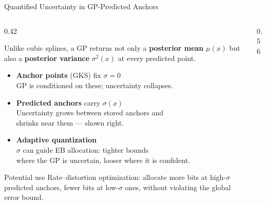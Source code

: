 \documentclass[aspectratio=169, 10pt]{beamer}
\begin{document}
\begin{frame}{Quantified Uncertainty in GP-Predicted Anchors}

\begin{columns}[T, totalwidth=\textwidth]
\begin{column}{0.42\textwidth}
  {\footnotesize
  Unlike cubic splines, a GP returns not only a \textbf{posterior mean}
  $\mu(x)$ but also a \textbf{posterior variance} $\sigma^2(x)$ at
  every predicted point.

  \medskip
  \begin{itemize}\setlength\itemsep{4pt}
    \item[\textcolor{camber}{\textbullet}]
      \textbf{Anchor points} (GKS) fix $\sigma\!=\!0$\\
      {\scriptsize GP is conditioned on these; uncertainty collapses.}
    \item[\textcolor{cmint}{\textbullet}]
      \textbf{Predicted anchors} carry $\sigma(x)$\\
      {\scriptsize Uncertainty grows between stored anchors and\\
       shrinks near them — shown right.}
    \item[\textcolor{cteal}{\textbullet}]
      \textbf{Adaptive quantization}\\
      {\scriptsize $\sigma$ can guide EB allocation: tighter bounds\\
       where the GP is uncertain, looser where it is confident.}
  \end{itemize}

  \medskip
  \begin{block}{\scriptsize Potential use}
    {\scriptsize
    Rate–distortion optimization: allocate more bits at high-$\sigma$
    predicted anchors, fewer bits at low-$\sigma$ ones, without
    violating the global error bound.}
  \end{block}
  }
\end{column}

\begin{column}{0.56\textwidth}
\centering
{}
\end{column}
\end{columns}
\end{frame}
\end{document}
